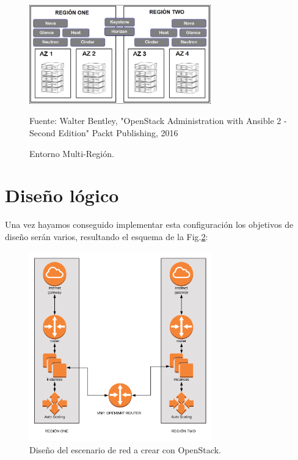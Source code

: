 \begin{figure}
    \centering
    \includegraphics[width=0.7\textwidth]{imagenes/capitulo5/active-active-region.png}
    \caption{Entorno Multi-Región.}
	\vspace{0.3cm}
    \footnotesize{Fuente: Walter Bentley, "OpenStack Administration with Ansible 2 - Second Edition" Packt Publishing, 2016 }
    \label{active-active-region}
\end{figure}

\section{Diseño lógico}
Una vez hayamos conseguido implementar esta configuración los objetivos de diseño serán varios, resultando el esquema de la Fig.\ref{logicoSDN}:

\begin{figure}
    \centering
    \includegraphics[width=0.7\textwidth]{imagenes/capitulo5/logico.png}
    \caption{Diseño del escenario de red a crear con OpenStack.}
	\vspace{0.3cm}
    \label{logicoSDN}
\end{figure}

